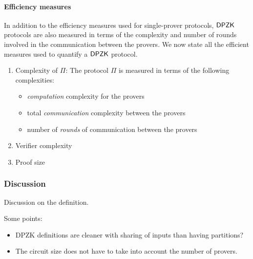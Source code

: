 \paragraph{Efficiency measures}
In addition to the efficiency measures used for single-prover protocols, $\mathsf{DPZK}$ protocols are also measured in terms of the complexity and number of rounds involved in the communication between the provers. We now state all the efficient measures used to quantify a $\mathsf{DPZK}$ protocol.
\begin{enumerate}
\item Complexity of $\Pi$: The protocol $\Pi$ is measured in terms of the following complexities:
\begin{itemize}
\item \textit{computation} complexity for the provers
\item total \textit{communication} complexity between the provers
\item number of \textit{rounds} of communication between the provers
\end{itemize}
\item Verifier complexity
\item Proof size
\end{enumerate}
 
\subsubsection{Discussion}
Discussion on the definition.

Some points:
\begin{itemize}
\item DPZK definitions are cleaner with sharing of inputs than having partitions?
\item The circuit size does not have to take into account the number of provers.
\end{itemize}

%
%
